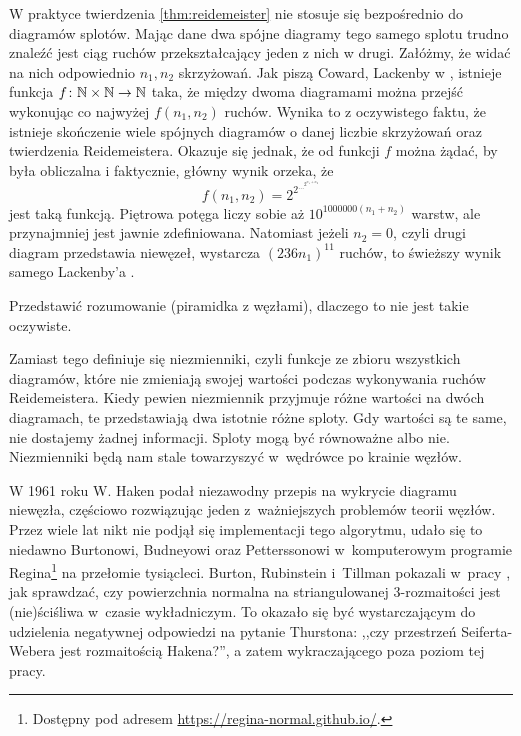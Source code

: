 W praktyce twierdzenia \ref{thm:reidemeister} nie stosuje się bezpośrednio do diagramów splotów.
Mając dane dwa spójne diagramy tego samego splotu trudno znaleźć jest ciąg ruchów przekształcający jeden z nich w drugi.
Załóżmy, że widać na nich odpowiednio $n_1, n_2$ skrzyżowań.
Jak piszą Coward, Lackenby w \cite{coward11}, istnieje funkcja $f \colon \mathbb N \times \mathbb N \to \mathbb N$ taka, że między dwoma diagramami można przejść wykonując co najwyżej $f(n_1, n_2)$ ruchów.
Wynika to z oczywistego faktu, że istnieje skończenie wiele spójnych diagramów o danej liczbie skrzyżowań oraz twierdzenia Reidemeistera.
Okazuje się jednak, że od funkcji $f$ można żądać, by była obliczalna i faktycznie, główny wynik \cite{coward11} orzeka, że
\begin{equation}
    f(n_1, n_2) = 2^{2^{\ldots^{2^{n_1 + n_2}}}}
\end{equation}
jest taką funkcją.
Piętrowa potęga liczy sobie aż $10^{1000000 (n_1 + n_2)}$ warstw, ale przynajmniej jest jawnie zdefiniowana.
Natomiast jeżeli $n_2 = 0$, czyli drugi diagram przedstawia niewęzeł, wystarcza $(236n_1)^{11}$ ruchów, to świeższy wynik samego Lackenby'a \cite{lackenby15}.

\begin{tobedone}
    Przedstawić rozumowanie (piramidka z węzłami), dlaczego to nie jest takie oczywiste.
\end{tobedone}

Zamiast tego definiuje się niezmienniki, czyli funkcje ze zbioru wszystkich diagramów, które nie zmieniają swojej wartości podczas wykonywania ruchów Reidemeistera.
Kiedy pewien niezmiennik przyjmuje różne wartości na dwóch diagramach, te przedstawiają dwa istotnie różne sploty.
Gdy wartości są te same, nie dostajemy żadnej informacji.
Sploty mogą być równoważne albo nie.
Niezmienniki będą nam stale towarzyszyć w~wędrówce po krainie węzłów.



W 1961 roku W. Haken \cite{haken61} podał niezawodny przepis na wykrycie diagramu niewęzła,
częściowo rozwiązując jeden z~ważniejszych problemów teorii węzłów.
Przez wiele lat nikt nie podjął się implementacji tego algorytmu,
udało się to niedawno Burtonowi, Budneyowi oraz Petterssonowi w~komputerowym programie Regina\footnote{Dostępny pod adresem \url{https://regina-normal.github.io/}.} na przełomie tysiącleci.
Burton, Rubinstein i~Tillman pokazali w~pracy \cite{burton12}, jak sprawdzać,
czy powierzchnia normalna na striangulowanej 3-rozmaitości jest (nie)ściśliwa w~czasie wykładniczym.
To okazało się być wystarczającym do udzielenia negatywnej odpowiedzi na pytanie Thurstona:
,,czy przestrzeń Seiferta-Webera jest rozmaitością Hakena?'',
a zatem wykraczającego poza poziom tej pracy.

